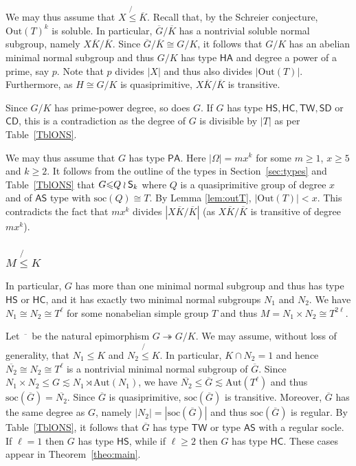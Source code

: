 \documentclass[twoside,12pt,leqno]{amsproc}
\numberwithin{table}{section}
\numberwithin{figure}{section}
\theoremstyle{plain}
\theoremstyle{definition}\newtheorem{definition}[theorem]{Definition}
\theoremstyle{definition}\newtheorem{example}[theorem]{Example}
\theoremstyle{definition}\newtheorem{construction}[theorem]{Construction}
\theoremstyle{definition}\newtheorem{remark}[theorem]{Remark}
\theoremstyle{definition}\newtheorem{problem}[theorem]{Problem}
\begin{document}
We may thus assume that $X\not{\leqslant}\overline{K}$. Recall that, by the Schreier conjecture, ${\mathrm{Out}}(T)^k$ is soluble. In particular,
$\overline{G}/\overline{K}$ has a nontrivial soluble normal subgroup,
namely $X\overline{K}/\overline{K}$. Since
$\overline{G}/\overline{K}\cong G/K$, it follows that $G/K$ has an
abelian minimal normal subgroup and thus $G/K$ has type ${\mathsf{HA}}$ and
degree a power of a prime, say $p$. Note that $p$ divides $|X|$ and
thus also divides $|{\mathrm{Out}}(T)|$. Furthermore, as $H\cong G/K$ is quasiprimitive,
$X\overline{K}/\overline{K}$ is transitive.

Since $G/K$ has prime-power degree, so does $G$. If $G$ has type ${\mathsf{HS}},
{\mathsf{HC}}, {\mathsf{TW}}, {\mathsf{SD}}$ or ${\mathsf{CD}}$, this is a contradiction as the degree of $G$
is divisible by $|T|$ as per Table~\ref{TblONS}.

We may thus assume that $G$ has type ${\mathsf{PA}}$. Here $|\Omega|=mx^k$ for some
$m\geqslant 1$, $x\geqslant 5$ and $k\geqslant 2$.   It follows from the
outline of the types in Section~\ref{sec:types} and Table~\ref{TblONS}
that $G{\leqslant} Q\wr{\textup{\textsf{S}}}_k$ where $Q$ is a quasiprimitive group of  degree $x$ and of ${\mathsf{AS}}$ type with ${{\mathrm{soc}}}(Q)\cong T$.  By Lemma \ref{lem:outT},  $|{\mathrm{Out}}(T)|<x$. This contradicts the fact that $mx^k$ divides $|X\overline{K}/\overline{K}|$ (as $X\overline{K}/\overline{K}$ is transitive of degree $mx^k$).

\subsubsection{$M\not{\leqslant} K$}
In particular, $G$ has more than one minimal normal subgroup and thus
has type ${\mathsf{HS}}$ or ${\mathsf{HC}}$, and it has exactly two minimal normal
subgroups $N_1$ and $N_2$. We have $N_1\cong N_2\cong T^\ell$ for some
nonabelian simple group $T$ and thus $M=N_1\times N_2\cong T^{2\ell}$.

Let $\overline{\phantom{n}}$ be the natural epimorphism
$G\twoheadrightarrow G/K$. We may assume, without loss of generality,
that $N_1{\leqslant} K$ and $N_2\not{\leqslant} K$. In particular, $K\cap N_2=1$ and
hence $\overline{N_2}\cong N_2\cong T^\ell$ is a nontrivial minimal
normal subgroup of $\overline{G}$. Since $N_1\times N_2{\leqslant} G\lesssim
N_1 \rtimes{\mathrm{Aut}}(N_1)$, we have $\overline{N_2}{\leqslant}
\overline{G}\lesssim {\mathrm{Aut}}(T^\ell)$ and thus
${{\mathrm{soc}}}(\overline{G})=\overline{N_2}$. Since $\overline{G}$ is
quasiprimitive, ${{\mathrm{soc}}}(\overline{G})$ is transitive. Moreover,
$\overline{G}$ has the same degree as $G$, namely
$|N_2|=|{{\mathrm{soc}}}(\overline{G})|$ and thus ${{\mathrm{soc}}}(\overline{G})$ is
regular. By Table~\ref{TblONS}, it follows that $\overline{G}$ has
type ${\mathsf{TW}}$ or type ${\mathsf{AS}}$ with a regular socle. If $\ell=1$ then $G$
has type ${\mathsf{HS}}$, while if $\ell{\geqslant} 2$ then $G$ has type ${\mathsf{HC}}$. These
cases appear in Theorem~\ref{theo:main}.
\end{document}
